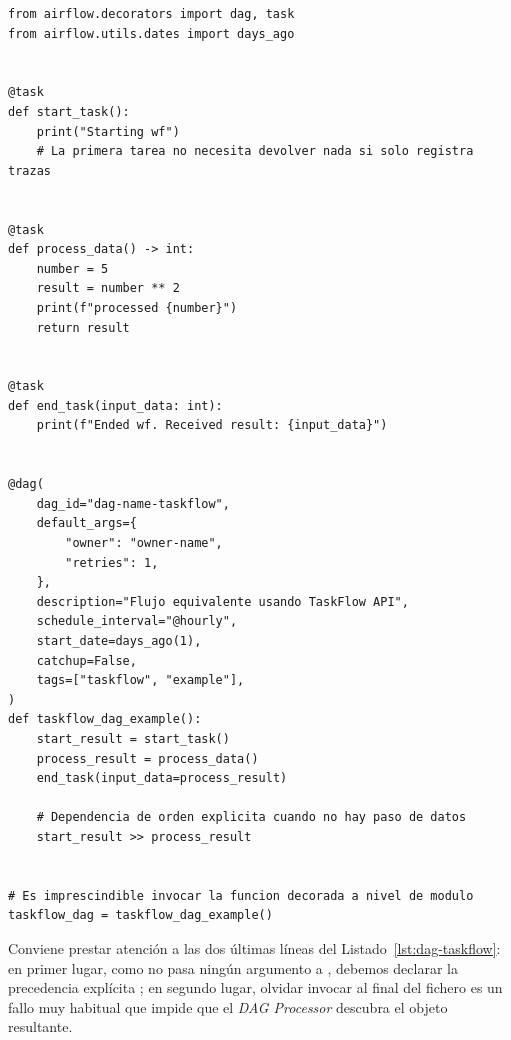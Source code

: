 \begin{lstlisting}[style=python, caption={Reescritura del DAG con TaskFlow API en Airflow 2.x (\code{@dag} y \code{@task}).}, label={lst:dag-taskflow}]
from airflow.decorators import dag, task
from airflow.utils.dates import days_ago


@task
def start_task():
    print("Starting wf")
    # La primera tarea no necesita devolver nada si solo registra trazas


@task
def process_data() -> int:
    number = 5
    result = number ** 2
    print(f"processed {number}")
    return result


@task
def end_task(input_data: int):
    print(f"Ended wf. Received result: {input_data}")


@dag(
    dag_id="dag-name-taskflow",
    default_args={
        "owner": "owner-name",
        "retries": 1,
    },
    description="Flujo equivalente usando TaskFlow API",
    schedule_interval="@hourly",
    start_date=days_ago(1),
    catchup=False,
    tags=["taskflow", "example"],
)
def taskflow_dag_example():
    start_result = start_task()
    process_result = process_data()
    end_task(input_data=process_result)

    # Dependencia de orden explicita cuando no hay paso de datos
    start_result >> process_result


# Es imprescindible invocar la funcion decorada a nivel de modulo
taskflow_dag = taskflow_dag_example()
\end{lstlisting}

Conviene prestar atención a las dos últimas líneas del Listado~\ref{lst:dag-taskflow}: en primer lugar, como  no pasa ningún argumento a , debemos declarar la precedencia explícita ; en segundo lugar, olvidar invocar  al final del fichero es un fallo muy habitual que impide que el \textit{DAG Processor} descubra el objeto  resultante.

